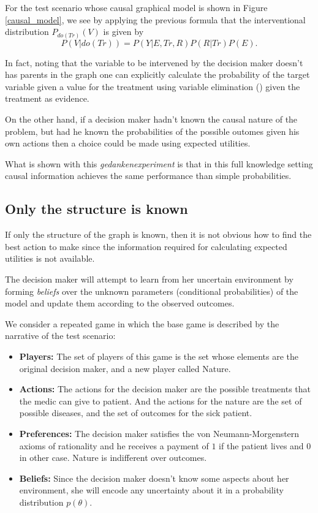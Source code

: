 \documentclass{article}
\begin{document}
For the test scenario whose causal graphical model is shown in Figure \ref{causal_model}, we see  by applying the previous formula that the interventional distribution $P_{do(Tr)}(V)$ is given by
\[ P(V | do(Tr))=P(Y | E, Tr, R)P(R | Tr) P(E). \]

In fact, noting that the variable to be intervened by the decision maker doesn't has parents in the graph one can explicitly calculate the probability of the target variable given a value for the treatment using variable elimination (\cite{koller2009probabilistic}) given the treatment as evidence. 

On the other hand, if a decision maker hadn't known the causal nature of the problem, but had he known the probabilities of the possible outomes given his own actions then a choice could be made using expected utilities. 

What is shown with this \textit{gedankenexperiment} is that in this full knowledge setting causal information achieves the same performance than simple probabilities.

\subsection{Only the structure is known}
If only the structure of the graph is known, then it is not obvious how to find the best action to make since the information required for calculating expected utilities is not available.

The decision maker will attempt to learn from her uncertain environment by forming \textit{beliefs} over the unknown parameters (conditional probabilities) of the model and update them according to the observed outcomes. 

We consider a repeated game in which the base game is described by the narrative of the test scenario: 
\begin{itemize}
\item \textbf{Players:} The set of players of this game is the set whose elements are the original decision maker, and a new player called Nature.
\item \textbf{Actions:} The actions for the decision maker are the possible treatments that the medic can give to patient. And the actions for the nature are the set of possible diseases, and the set of outcomes for the sick patient.
\item \textbf{Preferences:} The decision maker satisfies the von Neumann-Morgenstern axioms of rationality and he receives a payment of $1$ if the patient lives and $0$ in other case. Nature is indifferent over outcomes.
\item \textbf{Beliefs:} Since the decision maker doesn't know some aspects about her environment, she will encode any uncertainty about it in a probability distribution $p(\theta)$.
\end{itemize}
\end{document}
